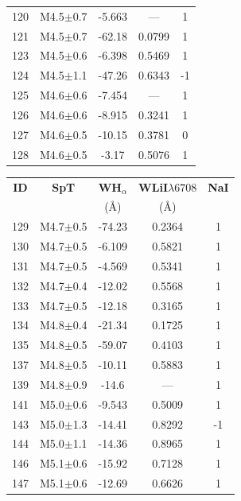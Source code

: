 \documentclass[12pt]{article}
\begin{document}
\begin{table}
\begin{threeparttable}
\begin{minipage}{0.48\textwidth}
\begin{tabular}{ccccc}
	  	120 & M4.5$\pm$0.7  & -5.663  & ---     & 1   \\ 
	  	121 & M4.5$\pm$0.7  & -62.18  & 0.0799  & 1   \\ 
	  	123 & M4.5$\pm$0.6  & -6.398  & 0.5469  & 1   \\ 
	  	124 & M4.5$\pm$1.1  & -47.26  & 0.6343  & -1  \\ 
	  	125 & M4.6$\pm$0.6  & -7.454  & ---     & 1   \\ 
	  	126 & M4.6$\pm$0.6  & -8.915  & 0.3241  & 1   \\ 
	  	127 & M4.6$\pm$0.5  & -10.15  & 0.3781  & 0   \\ 
	  	128 & M4.6$\pm$0.5  & -3.17   & 0.5076  & 1   \\ 
		\bottomrule
	  \end{tabular}
	\end{minipage} \hfill
	\begin{minipage}{0.48\textwidth}
  	\setlength{\tabcolsep}{10pt}
	\renewcommand{\arraystretch}{1.0}
	  \begin{tabular}{ccccc}
		\toprule
		{\bf ID} & {\bf SpT} & {\bf WH$_\alpha$} & {\bf WLiI$\lambda6708$} & {\bf NaI} \\
		   &     & (\AA)       & (\AA)             &     \\
		\midrule
	  	129 & M4.7$\pm$0.5  & -74.23  & 0.2364  & 1   \\ 
	  	130 & M4.7$\pm$0.5  & -6.109  & 0.5821  & 1   \\ 
	  	131 & M4.7$\pm$0.5  & -4.569  & 0.5341  & 1   \\ 
	  	132 & M4.7$\pm$0.4  & -12.02  & 0.5568  & 1   \\ 
	  	133 & M4.7$\pm$0.5  & -12.18  & 0.3165  & 1   \\ 
	  	134 & M4.8$\pm$0.4  & -21.34  & 0.1725  & 1   \\ 
	  	135 & M4.8$\pm$0.5  & -59.07  & 0.4103  & 1   \\ 
	  	137 & M4.8$\pm$0.5  & -10.11  & 0.5883  & 1   \\ 
	  	139 & M4.8$\pm$0.9  & -14.6   & ---     & 1   \\ 
	  	141 & M5.0$\pm$0.6  & -9.543  & 0.5009  & 1   \\ 
	  	143 & M5.0$\pm$1.3  & -14.41  & 0.8292  & -1  \\ 
	  	144 & M5.0$\pm$1.1  & -14.36  & 0.8965  & 1   \\ 
	  	146 & M5.1$\pm$0.6  & -15.92  & 0.7128  & 1   \\ 
	  	147 & M5.1$\pm$0.6  & -12.69  & 0.6626  & 1   \\ 

\end{tabular}
\end{minipage}
\end{threeparttable}
\end{table}
\end{document}
